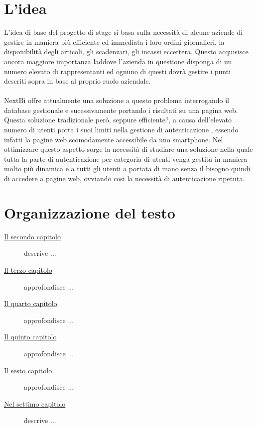 \section{L'idea}

L'idea di base del progetto di stage si basa sulla necessità di alcune aziende di gestire in maniera più efficiente ed immediata i loro ordini giornalieri, la disponibilità degli articoli, gli scadenzari, gli incassi eccettera. Questo acquisisce ancora maggiore importanza laddove l'azienda in questione disponga di un numero elevato di rappresentanti ed ognuno di questi dovrà gestire i punti descriti sopra in base al proprio ruolo aziendale. \\ \\

NextBi offre attualmente una soluzione a questo problema interrogando il database  gestionale e sucessivamente portando i risultati su una pagina web. Questa soluzione tradizionale però, seppure efficiente?, a causa dell'elevato numero di utenti porta i suoi limiti nella gestione di autenticazione , essendo infatti la pagine web scomodamente accessibile da uno smartphone. Nel ottimizzare questo aspetto sorge la necessità di studiare una soluzione nella quale tutta la parte di autenticazione per categoria di utenti venga gestita in maniera molto più dinamica e a tutti gli utenti a portata di mano senza il bisogno quindi di accedere a pagine web, ovviando cosi la necessità di autenticazione ripetuta.

\section{Organizzazione del testo}

\begin{description}
    \item[{\hyperref[cap:processi-metodologie]{Il secondo capitolo}}] descrive ...
    
    \item[{\hyperref[cap:descrizione-stage]{Il terzo capitolo}}] approfondisce ...
    
    \item[{\hyperref[cap:analisi-requisiti]{Il quarto capitolo}}] approfondisce ...
    
    \item[{\hyperref[cap:progettazione-codifica]{Il quinto capitolo}}] approfondisce ...
    
    \item[{\hyperref[cap:verifica-validazione]{Il sesto capitolo}}] approfondisce ...
    
    \item[{\hyperref[cap:conclusioni]{Nel settimo capitolo}}] descrive ...
\end{description}

